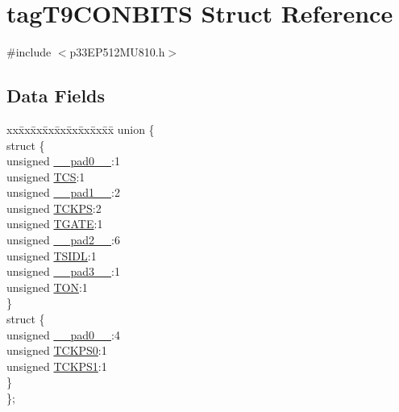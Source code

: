 \hypertarget{structtag_t9_c_o_n_b_i_t_s}{}\section{tag\+T9\+C\+O\+N\+B\+I\+TS Struct Reference}
\label{structtag_t9_c_o_n_b_i_t_s}


{\ttfamily \#include $<$p33\+E\+P512\+M\+U810.\+h$>$}

\subsection*{Data Fields}
\begin{DoxyCompactItemize}
\item 
\begin{tabbing}
xx\=xx\=xx\=xx\=xx\=xx\=xx\=xx\=xx\=\kill
union \{\\
\>struct \{\\
\>\>unsigned \hyperlink{structtag_t9_c_o_n_b_i_t_s_adf71f3d8410c1f1dbbc96680a92c49af}{\_\_pad0\_\_}:1\\
\>\>unsigned \hyperlink{structtag_t9_c_o_n_b_i_t_s_ab4daee3a10870ffba1c86d5020adb9b4}{TCS}:1\\
\>\>unsigned \hyperlink{structtag_t9_c_o_n_b_i_t_s_acaf2d0924a107ec6e8d2e31febaf66f9}{\_\_pad1\_\_}:2\\
\>\>unsigned \hyperlink{structtag_t9_c_o_n_b_i_t_s_a0d455d68434019feaabe9dfb64d75552}{TCKPS}:2\\
\>\>unsigned \hyperlink{structtag_t9_c_o_n_b_i_t_s_a35b6e4b591a8bd20e026168399eb0e6a}{TGATE}:1\\
\>\>unsigned \hyperlink{structtag_t9_c_o_n_b_i_t_s_a4d97cc5f7d51d22fc2bf3eab35c9cb7f}{\_\_pad2\_\_}:6\\
\>\>unsigned \hyperlink{structtag_t9_c_o_n_b_i_t_s_a4971b881615ef42703b5b78179fcda3d}{TSIDL}:1\\
\>\>unsigned \hyperlink{structtag_t9_c_o_n_b_i_t_s_ad7d7cee33e0c7f447abc4d171c628dd4}{\_\_pad3\_\_}:1\\
\>\>unsigned \hyperlink{structtag_t9_c_o_n_b_i_t_s_a8c2a094047d1019ce1c5b25ea8cff9b3}{TON}:1\\
\>\} \\
\>struct \{\\
\>\>unsigned \hyperlink{structtag_t9_c_o_n_b_i_t_s_adf71f3d8410c1f1dbbc96680a92c49af}{\_\_pad0\_\_}:4\\
\>\>unsigned \hyperlink{structtag_t9_c_o_n_b_i_t_s_a5cd4ef74604f5d88289a53f41cf38b7e}{TCKPS0}:1\\
\>\>unsigned \hyperlink{structtag_t9_c_o_n_b_i_t_s_ae190f2375c403c9fe8f5eb62a5bdf200}{TCKPS1}:1\\
\>\} \\
\}; \\

\end{tabbing}\end{DoxyCompactItemize}


